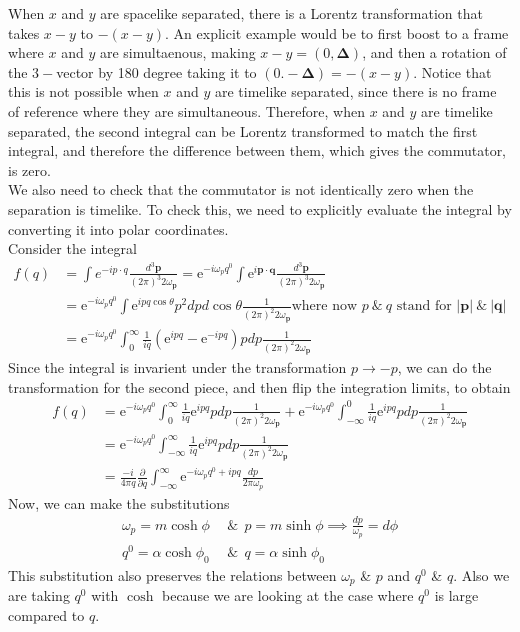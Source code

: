 \documentclass[11pt, notitlepage]{report}
\newcommand{\del}{\partial}
\newcommand{\e}{\mathrm{e}}
\newcommand{\w}{\omega}
\numberwithin{equation}{section}
\begin{document}
    When \(x\) and \(y\) are spacelike separated, there is a Lorentz transformation that takes \(x-y\) to \(-(x-y)\). An explicit example would be to first boost to a frame where \(x\) and \(y\) are simultaenous, making \(x-y = (0, \mathbf{\Delta})\), and then a rotation of the \(3-\)vector by 180 degree taking it to \((0.-\mathbf{\Delta}) = -(x-y)\). Notice that this is not possible when \(x\) and \(y\) are timelike separated, since there is no frame of reference where they are simultaneous. Therefore, when \(x\) and \(y\) are timelike separated, the second integral can be Lorentz transformed to match the first integral, and therefore the difference between them, which gives the commutator, is zero.\\

    We also need to check that the commutator is not identically zero when the separation is timelike. To check this, we need to explicitly evaluate the integral by converting it into polar coordinates.  \\
    Consider the integral 
    \begin{align*}
        f(q) &= \int e^{-ip\cdot q} \frac{d^3\textbf{p}}{(2\pi)^3{2\w_\textbf{p}}} = \e^{-i\w_p q^0} \int \e^{i\textbf{p}\cdot \textbf{q}} \frac{d^3\textbf{p}}{(2\pi)^3{2\w_\textbf{p}}}\\
        &= \e^{-i\w_p q^0} \int \e^{ipq\cos\theta} p^2 dp d\cos\theta\frac{1}{(2\pi)^2{2\w_\textbf{p}}} \text{where now }p~\&~q\text{ stand for } |\textbf{p}|~\&~|\textbf{q}|\\
        &= \e^{-i\w_p q^0}\int_0^\infty \frac{1}{iq}\left(  \e^{ipq} - \e^{-ipq}  \right) pdp \frac{1}{(2\pi)^2{2\w_\textbf{p}}}
    \end{align*}
    Since the integral is invarient under the transformation \(p\to-p\), we can do the transformation for the second piece, and then flip the integration limits, to obtain 
    \begin{align*}
        f(q) &= \e^{-i\w_p q^0}\int_0^\infty \frac{1}{iq} \e^{ipq} pdp \frac{1}{(2\pi)^2{2\w_\textbf{p}}} + \e^{-i\w_p q^0}\int_{-\infty}^0 \frac{1}{iq} \e^{ipq} pdp \frac{1}{(2\pi)^2{2\w_\textbf{p}}}\\
        &=\e^{-i\w_p q^0}\int_{-\infty}^\infty \frac{1}{iq} \e^{ipq} pdp \frac{1}{(2\pi)^2{2\w_\textbf{p}}}\\
        &= \frac{-i}{4\pi q} \frac{\del}{\del q} \int_{-\infty}^{\infty} \e^{-i\w_p q^0+ipq} \frac{dp}{2\pi\w_p} 
    \end{align*}
    Now, we can make the substitutions 
    \begin{align*}
        \w_p = m\cosh\phi ~~&\&~~ p = m\sinh \phi \implies \frac{dp}{\w_p} = d\phi\\
        q^0 = \alpha \cosh\phi_0 ~~&\&~~ q = \alpha\sinh \phi_0 
    \end{align*}
    This substitution also preserves the relations between \(\w_p\) \& \(p\) and \(q^0\) \& \(q\). Also we are taking \(q^0\) with \(\cosh\) because we are looking at the case where \(q^0\) is large compared to \(q\).\\
\end{document}
